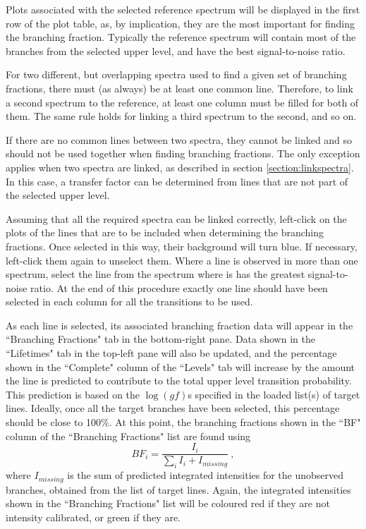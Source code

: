 \documentclass[a4paper,12pt]{report}
\begin{document}
Plots associated with the selected reference spectrum will be displayed in the first row of the plot table, as, by implication, they are the most important for finding the branching fraction. Typically the reference spectrum will contain most of the branches from the selected upper level, and have the best signal-to-noise ratio. 

For two different, but overlapping spectra used to find a given set of branching fractions, there must (as always) be at least one common line. Therefore, to link a second spectrum to the reference, at least one column must be filled for both of them. The same rule holds for linking a third spectrum to the second, and so on. 

If there are no common lines between two spectra, they cannot be linked and so should not be used together when finding branching fractions. The only exception applies when two spectra are linked, as described in section \ref{section:linkspectra}. In this case, a transfer factor can be determined from lines that are not part of the selected upper level.

Assuming that all the required spectra can be linked correctly, left-click on the plots of the lines that are to be included when determining the branching fractions. Once selected in this way, their background will turn blue. If necessary, left-click them again to unselect them. Where a line is observed in more than one spectrum, select the line from the spectrum where is has the greatest signal-to-noise ratio. At the end of this procedure exactly one line should have been selected in each column for all the transitions to be used.

As each line is selected, its associated branching fraction data will appear in the ``Branching Fractions" tab in the bottom-right pane. Data shown in the ``Lifetimes" tab in the top-left pane will also be updated, and the percentage shown in the ``Complete" column of the ``Levels" tab will increase by the amount the line is predicted to contribute to the total upper level transition probability. This prediction is based on the $\log(gf)$s specified in the loaded list(s) of target lines. Ideally, once all the target branches have been selected, this percentage should be close to 100\%. At this point, the branching fractions shown in the ``BF" column of the ``Branching Fractions" list are found using
\begin{equation}
\label{eqn:bfexpt}
BF_i = \frac{I_i}{\sum_i{I_i} + I_{missing}}~,
\end{equation}
where $I_{missing}$ is the sum of predicted integrated intensities for the unobserved branches, obtained from the list of target lines. Again, the integrated intensities shown in the ``Branching Fractions" list will be coloured \colorbox{int_not_calibrated}{red} if they are not intensity calibrated, or \colorbox{int_calibrated}{green} if they are.
\end{document}
